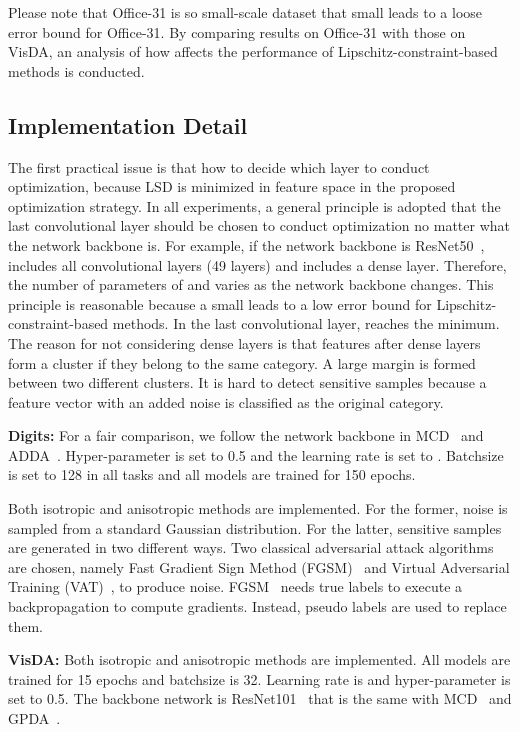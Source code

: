 \documentclass[journal,twocolumn]{IEEEtran}
\theoremstyle{definition}
\begin{document}
Please note that Office-31 is so small-scale dataset that small  leads to a loose error bound for Office-31. By comparing results on Office-31 with those on VisDA, an analysis of how  affects the performance of Lipschitz-constraint-based methods is conducted.

\subsection{Implementation Detail}

The first practical issue is that how to decide which layer to conduct optimization, because LSD is minimized in feature space in the proposed optimization strategy. In all experiments, a general principle is adopted that the last convolutional layer should be chosen to conduct optimization no matter what the network backbone is. For example, if the network backbone is ResNet50~\cite{7780459},  includes all convolutional layers (49 layers) and  includes a dense layer. Therefore, the number of parameters of  and  varies as the network backbone changes. This principle is reasonable because a small  leads to a low error bound for Lipschitz-constraint-based methods. In the last convolutional layer,  reaches the minimum. The reason for not considering dense layers is that features after dense layers form a cluster if they belong to the same category. A large margin is formed between two different clusters. It is hard to detect sensitive samples because a feature vector with an added noise is classified as the original category.  

{\bf Digits:} For a fair comparison, we follow the network backbone in MCD~\cite{saito2018maximum} and ADDA~\cite{tzeng2017adversarial}. Hyper-parameter  is set to 0.5 and the learning rate is set to . Batchsize is set to 128 in all tasks and all models are trained for 150 epochs.

Both isotropic and anisotropic methods are implemented. For the former, noise is sampled from a standard Gaussian distribution. For the latter, sensitive samples are generated in two different ways.  Two classical adversarial attack algorithms are chosen, namely Fast Gradient Sign Method (FGSM)~\cite{goodfellow2014explaining} and Virtual Adversarial Training (VAT)~\cite{miyato2018virtual}, to produce noise. FGSM~\cite{goodfellow2014explaining} needs true labels to execute a backpropagation to compute gradients. Instead, pseudo labels are used to replace them. 

{\bf VisDA:} Both isotropic and anisotropic methods are implemented. All models are trained for 15 epochs and batchsize is  32. Learning rate is  and hyper-parameter  is set to 0.5. The backbone network is ResNet101~\cite{7780459} that is the same with MCD~\cite{saito2018maximum} and GPDA~\cite{8953535}.
\end{document}
